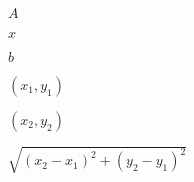 \documentclass{article}
\begin{document}
$A$
\pagebreak

$x$
\pagebreak

$b$
\pagebreak

$(x_1,y_1)$
\pagebreak

$(x_2,y_2)$
\pagebreak

$\sqrt{(x_2-x_1)^2+(y_2-y_1)^2}$
\pagebreak
\end{document}
